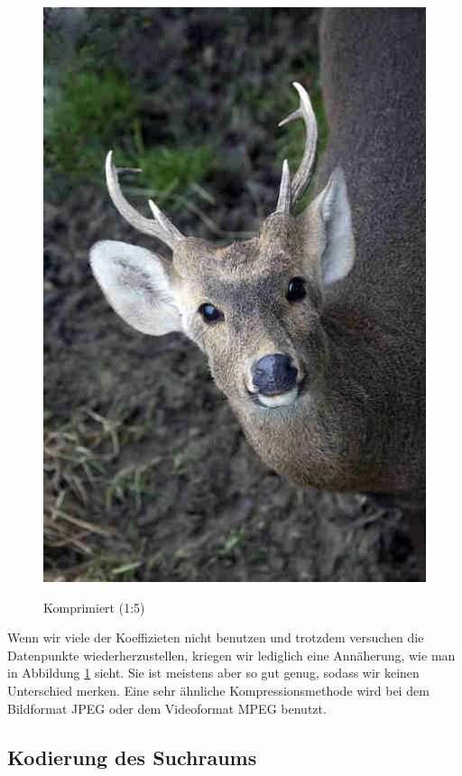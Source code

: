 \begin{multicols}{2}
\begin{figure}[H]
\begin{center}
                    \includegraphics[scale=0.36]{../pictures/gazelle-compressed.jpg}\\
                    \caption{Komprimiert (1:5)}\label{fig:gazelle-compressed}
                \end{center}
            \end{figure}
        \end{multicols}

        \noindent
        Wenn wir viele der Koeffizieten nicht benutzen und trotzdem versuchen die Datenpunkte wiederherzustellen, kriegen wir lediglich eine Annäherung, wie man in Abbildung \ref{fig:gazelle-compressed} sieht. Sie ist meistens aber so gut genug, sodass wir keinen Unterschied merken. Eine sehr ähnliche Kompressionsmethode wird bei dem Bildformat JPEG \cite{jpeg} oder dem Videoformat MPEG \cite{mitchell1997mpeg} benutzt.

        \subsection{Kodierung des Suchraums}

